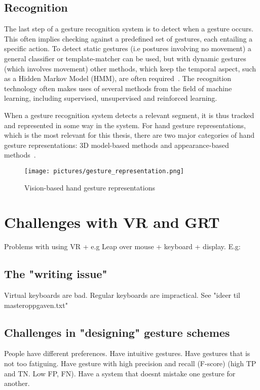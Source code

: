 \subsection{Recognition}
The last step of a gesture recognition system is to detect when a gesture occurs. 
This often implies checking against a predefined set of gestures, each entailing a specific action. 
To detect static gestures (i.e postures involving no movement) a general classifier or template-matcher can be used, 
but with dynamic gestures (which involves movement) other methods, which keep the temporal aspect, such as a Hidden Markov Model (HMM), are often required~\citep{Benton1995}. 
The recognition technology often makes uses of several methods from the field of machine learning, including supervised, unsupervised and reinforced learning.

When a gesture recognition system detects a relevant segment, it is thus tracked and represented in some way in the system. For hand gesture representations, 
which is the most relevant for this thesis, there are two major categories of hand gesture representations: 3D model-based methods and appearance-based methods~\citep{Rautaray2015}.

\begin{figure}%
	\texttt{[image: pictures/gesture\_representation.png]}
	\caption[Vision-based hand gesture representations]{Vision-based hand gesture representations~\citep{Bourke2007} }
	\label{fig:oculus}
\end{figure}


\section{Challenges with VR and GRT} 
Problems with using VR + e.g Leap over mouse + keyboard + display. E.g:

\subsection{The "writing issue"}
Virtual keyboards are bad. 
Regular keyboards are impractical. 
See "ideer til masteroppgaven.txt"

\subsection{Challenges in "designing" gesture schemes}
People have different preferences. Have intuitive gestures. Have gestures that is not too
fatiguing. Have gesture with high precision and recall (F-score) (high TP and TN. Low FP, FN).
Have a system that doesnt mistake one gesture for another.

